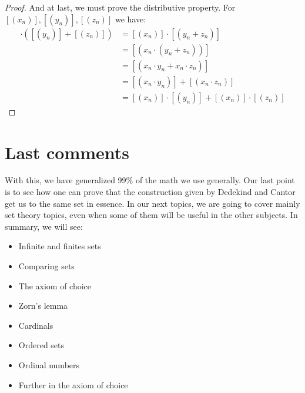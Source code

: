 \documentclass{tufte-handout}
\begin{document}
\begin{proof}
	And at last, we must prove the distributive property. For $[(x_n)], [(y_n)], [(z_n)]$ we have:
	\begin{align*}
		[(x_n)] \cdot ([(y_n)] + [(z_n)]) &= [(x_n)] \cdot [(y_n + z_n)]\\
		&= [(x_n \cdot (y_n + z_n))]\\
		&= [(x_n \cdot y_n + x_n \cdot z_n)]\\
		&= [(x_n \cdot y_n)] + [(x_n \cdot z_n)]\\
		&= [(x_n)] \cdot [(y_n)] + [(x_n)] \cdot [(z_n)] 
	\end{align*}
\end{proof}

\section{Last comments}
With this, we have generalized 99\% of the math we use generally. Our last point is to see how one can prove that the construction given by Dedekind and Cantor get us to the same set in essence. In our next topics, we are going to cover mainly set theory topics, even when some of them will be useful in the other subjects. In summary, we will see:
\begin{itemize}
	\item Infinite and finites sets
	\item Comparing sets
	\item The axiom of choice
	\item Zorn's lemma
	\item Cardinals
	\item Ordered sets
	\item Ordinal numbers
	\item Further in the axiom of choice
\end{itemize} 
\end{document}
